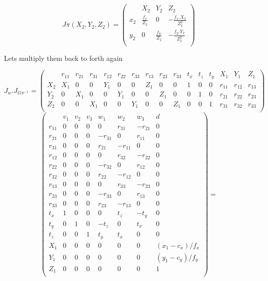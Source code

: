 \documentclass[a4paper,12pt]{article}
\begin{document}
\[ J{\pi}(X_2,Y_2,Z_2) = \begin{pmatrix}
& X_2 & Y_2 & Z_2\\
x_2 & \frac{f_x}{Z_2} & 0 & -\frac{f_x.X_2}{Z^2_{2}} \\
y_2 & 0 & \frac{f_Y}{Z_2} & -\frac{f_y.Y_2}{Z^2_{2}} \\
\end{pmatrix} 
\]

\vspace*{7cm}
Lets multiply them back to forth again

\[
J_w.J_{G\pi^{-1}} =
\begin{pmatrix}  
& r_{11} & r_{21} & r_{31} & r_{12} & r_{22} & r_{33} & r_{13} & r_{23} & r_{33} & t_x & t_z & t_y & X_1 & Y_1 & Z_1 \\ 
X_2 & X_1 & 0 & 0 & Y_1 & 0 & 0 & Z_1 & 0 & 0 & 1 & 0 & 0 & r_{11} & r_{12} & r_{13}\\
Y_2 & 0 & X_1 & 0 & 0 & Y_1 & 0 & 0 & Z_1 & 0 & 0 & 1 & 0 & r_{21} & r_{22} & r_{23}\\
Z_2 & 0 & 0 & X_1 & 0 & 0 & Y_1 & 0 & 0 & Z_1 & 0 & 0 & 1 & r_{31} & r_{32} & r_{33}\\
\end{pmatrix}
\]
\[
\begin{pmatrix}  
& v_1 & v_2 & v_3 & w_1 & w_2 & w_3 & d\\ 

r_{11} & 0 & 0 & 0 & 0 & r_{31} & -r_{21} & 0 \\
r_{21} & 0 & 0 & 0 & -r_{31} & 0 & r_{11} & 0 \\
r_{31} & 0 & 0 & 0 & r_{21} & -r_{11} & 0 & 0 \\
r_{12} & 0 & 0 & 0 & 0 & r_{32} & -r_{22} & 0 \\
r_{22} & 0 & 0 & 0 & -r_{32} & 0 & r_{12} & 0 \\
r_{32} & 0 & 0 & 0 & r_{22} & -r_{12} & 0 & 0 \\
r_{13} & 0 & 0 & 0 & 0 & r_{33} & -r_{23} & 0 \\
r_{23} & 0 & 0 & 0 & -r_{33} & 0 & r_{13} & 0 \\
r_{33} & 0 & 0 & 0 & r_{23} & -r_{13} & 0 & 0 \\
t_x & 1 & 0 & 0 & 0 & t_z & -t_y & 0 \\
t_y & 0 & 1 & 0 & -t_z & 0 & t_x & 0 \\
t_z & 0 & 0 & 1 & t_y & t_x & 0 & 0 \\
X_1 & 0 & 0 & 0 & 0 & 0 & 0 & (x_1-c_x)/f_x\\
Y_1 & 0 & 0 & 0 & 0 & 0 & 0 & (y_1-c_y)/f_y \\
Z_1 & 0 & 0 & 0 & 0 & 0 & 0 & 1 \\
\end{pmatrix}
 = 
\]
\end{document}
